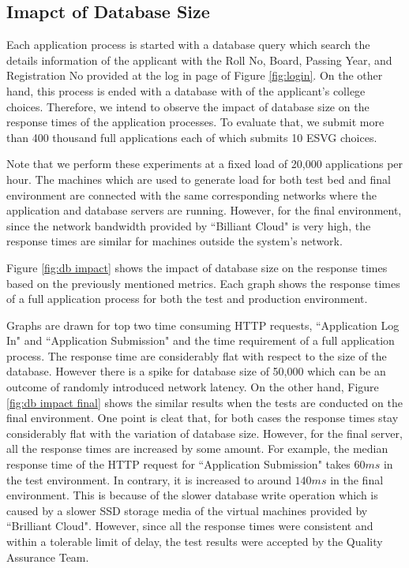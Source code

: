 \documentclass[sigconf,authordraft]{acmart}
\begin{document}
\subsection{Imapct of Database Size}
Each application process is started with a database query which search the details information of the applicant with the Roll No, Board, Passing Year, and Registration No provided at the log in page of Figure \ref{fig:login}. On the other hand, this process is ended with a database with of the applicant's college choices. Therefore, we intend to observe the impact of database size on the response times of the application processes. To evaluate that, we submit more than 400 thousand full applications each of which submits 10 ESVG choices. 

Note that we perform these experiments at a fixed load of 20,000 applications per hour. The machines which are used to generate load for both test bed and final environment are connected with the same corresponding networks where the application and database servers are running. However, for the final environment, since the network bandwidth provided by ``Billiant Cloud" is very high, the response times are similar for machines outside the system's network.
 
Figure \ref{fig:db impact} shows the impact of database size on the response times based on the previously mentioned metrics. Each graph shows the response times of a full application process for both the test and production environment. 

Graphs are drawn for top two time consuming HTTP requests, ``Application Log In" and ``Application Submission" and the time requirement of a full application process. The response time are considerably flat with respect to the size of the database. However there is a spike for database size of 50,000 which can be an outcome of randomly introduced network latency. 
On the other hand, Figure \ref{fig:db impact final} shows the similar results when the tests are conducted on the final environment. One point is cleat that, for both cases the response times stay considerably flat with the variation of database size. However, for the final server, all the response times are increased by some amount. For example, the median response time of the HTTP request for ``Application Submission" takes $60ms$ in the test environment. In contrary, it is increased to around $140ms$ in the final environment. This is because of the slower database write operation which is caused by a slower SSD storage media of the virtual machines provided by ``Brilliant Cloud". However, since all the response times were consistent and within a tolerable limit of delay, the test results were accepted by the Quality Assurance Team. 
\end{document}
